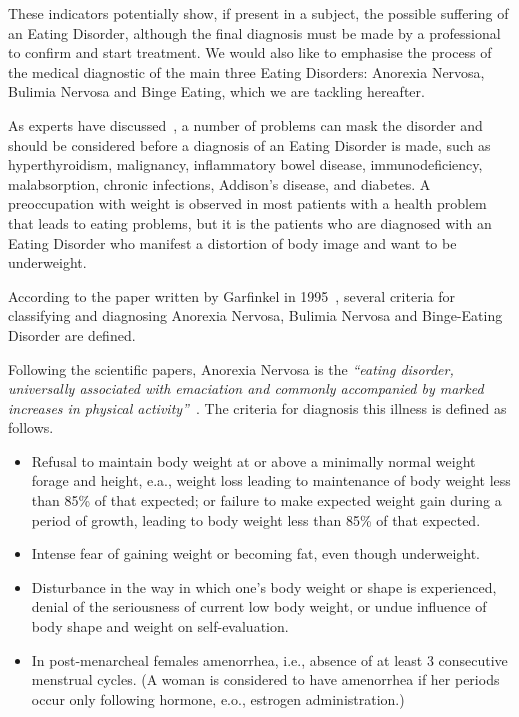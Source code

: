 These indicators potentially show, if present in a subject, the possible suffering of an Eating Disorder, although the final diagnosis must be made by a professional to confirm and start treatment. We would also like to emphasise the process of the medical diagnostic of the main three Eating Disorders: Anorexia Nervosa, Bulimia Nervosa and Binge Eating, which we are tackling hereafter.


As experts have discussed~\cite{pritts2003diagnosis}, a number of problems can mask the disorder and should be considered before a diagnosis of an Eating Disorder is made, such as hyperthyroidism, malignancy, inflammatory bowel disease, immunodeficiency, malabsorption, chronic infections, Addison's disease, and diabetes. A preoccupation with weight is observed in most patients with a health problem that leads to eating problems, but it is the patients who are diagnosed with an Eating Disorder who manifest a distortion of body image and want to be underweight.

According to the paper written by Garfinkel in 1995~\cite{garfinkel1995views}, several criteria for classifying and diagnosing Anorexia Nervosa, Bulimia Nervosa and Binge-Eating Disorder are defined.


Following the scientific papers, Anorexia Nervosa is the \textit{``eating disorder, universally associated with emaciation and commonly accompanied by marked increases in physical activity''}~\cite{bulik2005anorexia}. The criteria for diagnosis this illness is defined as follows.
\begin{itemize}
    \item Refusal to maintain body weight at or above a minimally normal weight forage and height, e.a., weight loss leading to maintenance of body weight less than 85\% of that expected; or failure to make expected weight gain during a period of growth, leading to body weight less than 85\% of that expected.
    \item Intense fear of gaining weight or becoming fat, even though underweight.
    \item Disturbance in the way in which one's body weight or shape is experienced, denial of the seriousness of current low body weight, or undue influence of body shape and weight on self-evaluation.
    \item In post-menarcheal females amenorrhea, i.e., absence of at least 3 consecutive menstrual cycles. (A woman is considered to have amenorrhea if her periods occur only following hormone, e.o., estrogen administration.)
\end{itemize}

